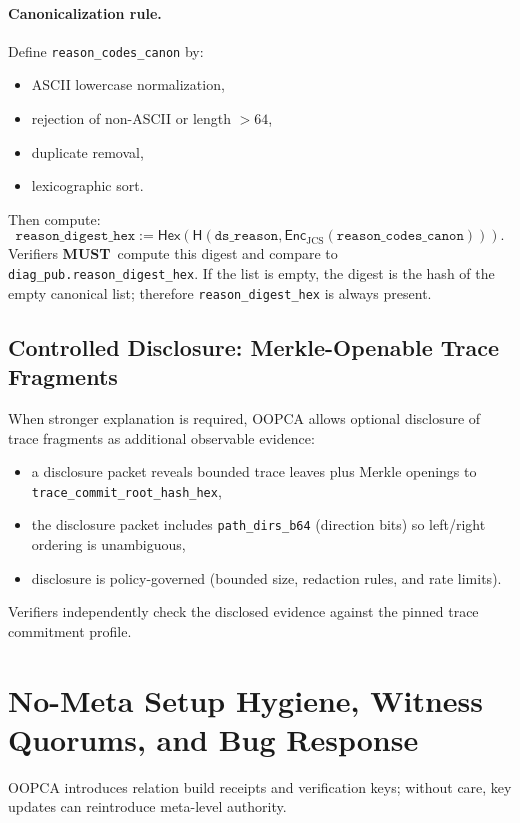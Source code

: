 \documentclass[11pt]{article}
\newcommand{\MUST}{\textbf{MUST}}
\newcommand{\Hash}{\mathsf{H}}
\newcommand{\Enc}{\mathsf{Enc}}
\newcommand{\Hex}{\mathsf{Hex}}
\begin{document}
\paragraph{Canonicalization rule.}
Define \texttt{reason\_codes\_canon} by:
\begin{itemize}[leftmargin=1.2em]
  \item ASCII lowercase normalization,
  \item rejection of non-ASCII or length $>64$,
  \item duplicate removal,
  \item lexicographic sort.
\end{itemize}
Then compute:
\[
\texttt{reason\_digest\_hex} := \Hex(\Hash(\texttt{ds\_reason}, \Enc_{\text{JCS}}(\texttt{reason\_codes\_canon}))).
\]
Verifiers \MUST\ compute this digest and compare to \texttt{diag\_pub.reason\_digest\_hex}. If the list is empty, the digest is the hash of the empty canonical list; therefore \texttt{reason\_digest\_hex} is always present.

\subsection{Controlled Disclosure: Merkle-Openable Trace Fragments}\label{sec:disclosure}

When stronger explanation is required, OOPCA allows optional disclosure of trace fragments as additional observable evidence:
\begin{itemize}[leftmargin=1.2em]
  \item a disclosure packet reveals bounded trace leaves plus Merkle openings to \texttt{trace\_commit\_root\_hash\_hex},
  \item the disclosure packet includes \texttt{path\_dirs\_b64} (direction bits) so left/right ordering is unambiguous,
  \item disclosure is policy-governed (bounded size, redaction rules, and rate limits).
\end{itemize}
Verifiers independently check the disclosed evidence against the pinned trace commitment profile.

\section{No-Meta Setup Hygiene, Witness Quorums, and Bug Response}\label{sec:setup}

OOPCA introduces relation build receipts and verification keys; without care, key updates can reintroduce meta-level authority.
\end{document}
